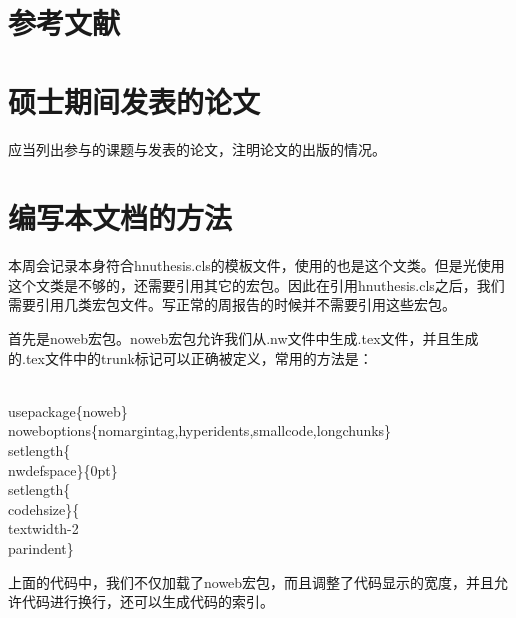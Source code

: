 \documentclass{hnuthesis}%
\begin{document}
\chapter*{参考文献}


\parencite{王文清2009CALIS}

\printbibliography[heading=none]


\nwenddocs{}\chapter*{硕士期间发表的论文}

应当列出参与的课题与发表的论文，注明论文的出版的情况。
\nwenddocs{}%
\appendix


\chapter{编写本文档的方法}

本周会记录本身符合hnuthesis.cls的模板文件，使用的也是这个文类。但是光使用这个文类是不够的，还需要引用其它的宏包。因此在引用hnuthesis.cls之后，我们需要引用几类宏包文件。写正常的周报告的时候并不需要引用这些宏包。

首先是noweb宏包。noweb宏包允许我们从.nw文件中生成.tex文件，并且生成的.tex文件中的trunk标记可以正确被定义，常用的方法是：

\begin{nowebtrunk}
\nwenddocs{}\endmoddef\nwstartdeflinemarkup\nwenddeflinemarkup
\\usepackage\{noweb\}
\\noweboptions\{nomargintag,hyperidents,smallcode,longchunks\}
\\setlength\{\\nwdefspace\}\{0pt\}
\\setlength\{\\codehsize\}\{\\textwidth-2\\parindent\}
\nwendcode{}\end{nowebtrunk}

上面的代码中，我们不仅加载了noweb宏包，而且调整了代码显示的宽度，并且允许代码进行换行，还可以生成代码的索引。
\end{document}
